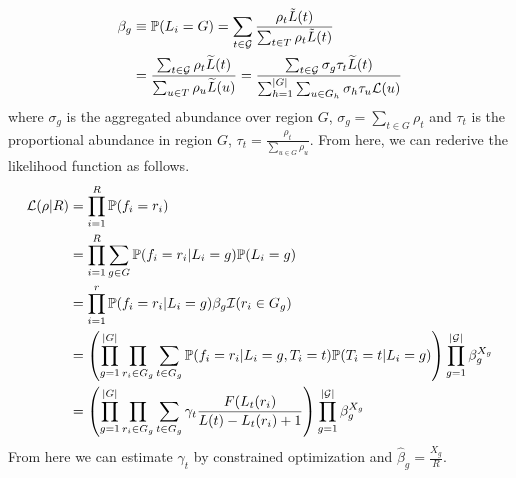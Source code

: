 \documentclass[11pt]{article}
\begin{document}
\begin{align*}
\beta_g &\equiv {\mathbb{P}}(L_i = G)= \sum_{t\in \mathcal{G}}\frac{\rho_t\tilde{L}(t)}{\sum_{t\in T}\rho_{t}\tilde{L}(t)}\\
&= \frac{\sum_{t\in \mathcal{G}}\rho_t\widetilde{L}(t)}{\sum_{u\in T}\rho_u\widetilde{L}(u)}= \frac{\sum_{t\in \mathcal{G}}\sigma_g\tau_t\widetilde{L}(t)}{\sum_{h=1}^{|G|}\sum_{u\in G_h}\sigma_h\tau_u\mathcal{L}(u)}\\
\end{align*}
where $\sigma_g$ is the aggregated abundance over region $G$, $\sigma_g = \sum_{t\in G}\rho_t$ and $\tau_t$ is the proportional abundance in region $G$, $\tau_t= \frac{\rho_t}{\sum_{u\in G}\rho_u}$. From here, we can rederive the likelihood function as follows. 
\begin{align*}
\mathcal{L}(\rho|R) &= \prod_{i=1}^R{\mathbb{P}}(f_i = r_i)\\
&= \prod_{i=1}^R\sum_{g\in G}{\mathbb{P}}(f_i = r_i|L_i = g){\mathbb{P}}(L_i = 	g)\\
&= \prod_{i=1}^r{\mathbb{P}}(f_i = r_i|L_i = g)\beta_g\mathcal{I}(r_i\in G_g)\\
&= \left(\prod_{g=1}^{|G|}\prod_{r_i\in G_g}\sum_{t\in G_g}{\mathbb{P}}(f_i=r_i|L_i = g, T_i = t){\mathbb{P}}(T_i = t|L_i = g)\right)\prod_{g=1}^{|\mathcal{G}|}\beta_g^{X_g}\\
&= \left(\prod_{g=1}^{|G|}\prod_{r_i\in G_g}\sum_{t\in G_g}\gamma_{t}\frac{F(L_t(r_i)}{L(t)-L_t(r_i)+1}\right)\prod_{g=1}^{|\mathcal{G}|}\beta_g^{X_g}
\end{align*}
From here we can estimate $\gamma_t$ by constrained optimization and $\hat{\beta}_g=\frac{X_g}{R}$. 
\end{document}
